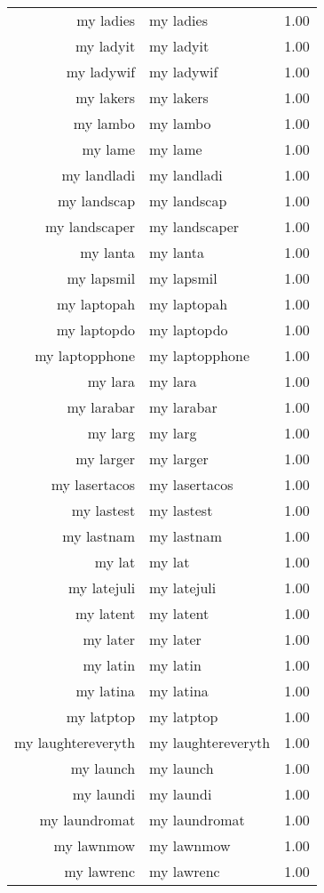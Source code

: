 \begin{table}[ht]
\begin{tabular}{rlr}
  my ladies & my ladies & 1.00 \\ 
  my ladyit & my ladyit & 1.00 \\ 
  my ladywif & my ladywif & 1.00 \\ 
  my lakers & my lakers & 1.00 \\ 
  my lambo & my lambo & 1.00 \\ 
  my lame & my lame & 1.00 \\ 
  my landladi & my landladi & 1.00 \\ 
  my landscap & my landscap & 1.00 \\ 
  my landscaper & my landscaper & 1.00 \\ 
  my lanta & my lanta & 1.00 \\ 
  my lapsmil & my lapsmil & 1.00 \\ 
  my laptopah & my laptopah & 1.00 \\ 
  my laptopdo & my laptopdo & 1.00 \\ 
  my laptopphone & my laptopphone & 1.00 \\ 
  my lara & my lara & 1.00 \\ 
  my larabar & my larabar & 1.00 \\ 
  my larg & my larg & 1.00 \\ 
  my larger & my larger & 1.00 \\ 
  my lasertacos & my lasertacos & 1.00 \\ 
  my lastest & my lastest & 1.00 \\ 
  my lastnam & my lastnam & 1.00 \\ 
  my lat & my lat & 1.00 \\ 
  my latejuli & my latejuli & 1.00 \\ 
  my latent & my latent & 1.00 \\ 
  my later & my later & 1.00 \\ 
  my latin & my latin & 1.00 \\ 
  my latina & my latina & 1.00 \\ 
  my latptop & my latptop & 1.00 \\ 
  my laughtereveryth & my laughtereveryth & 1.00 \\ 
  my launch & my launch & 1.00 \\ 
  my laundi & my laundi & 1.00 \\ 
  my laundromat & my laundromat & 1.00 \\ 
  my lawnmow & my lawnmow & 1.00 \\ 
  my lawrenc & my lawrenc & 1.00 \\ 

\end{tabular}
\end{table}
